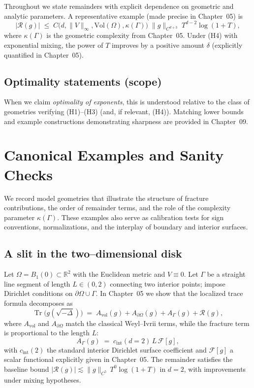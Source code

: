 Throughout we state remainders with explicit dependence on geometric and
analytic parameters. A representative example (made precise in
Chapter~05) is
\[
  |\mathcal{R}(g)| \;\le\;
  C\big(d,\|V\|_\infty,\mathrm{Vol}(\Omega),\kappa(\Gamma)\big)\;
  \|g\|_{C^{d+3}}\; T^{d-2}\log(1+T),
\]
where $\kappa(\Gamma)$ is the geometric complexity from
Chapter~05. Under (H4) with exponential mixing, the power of $T$ improves by
a positive amount $\delta$ (explicitly quantified in Chapter~05).

\subsection{Optimality statements (scope)}
\label{sub:intro-optimality-scope}

When we claim \emph{optimality of exponents}, this is understood relative
to the class of geometries verifying (H1)–(H3) (and, if relevant, (H4)).
Matching lower bounds and example constructions demonstrating sharpness are
provided in Chapter~09.


\section{Canonical Examples and Sanity Checks}
\label{sec:intro-examples}

We record model geometries that illustrate the structure of fracture
contributions, the order of remainder terms, and the role of the complexity
parameter $\kappa(\Gamma)$. These examples also serve as calibration tests
for sign conventions, normalizations, and the interplay of boundary and
interior surfaces.

\subsection{A slit in the two–dimensional disk}
\label{sub:intro-ex-disk-slit}

Let $\Omega=B_1(0)\subset\mathbb{R}^2$ with the Euclidean metric and
$V\equiv 0$. Let $\Gamma$ be a straight line segment of length $L\in(0,2)$
connecting two interior points; impose Dirichlet conditions on
$\partial\Omega\cup\Gamma$. In Chapter~05 we show that the localized trace
formula decomposes as
\[
  \operatorname{Tr}\big(g(\sqrt{-\Delta})\big)
  \;=\; A_{\mathrm{vol}}(g) + A_{\partial\Omega}(g)
        + A_\Gamma(g) + \mathcal{R}(g),
\]
where $A_{\mathrm{vol}}$ and $A_{\partial\Omega}$ match the classical
Weyl–Ivrii terms, while the fracture term is proportional to the length $L$:
\[
  A_\Gamma(g) \;=\; c_{\mathrm{int}}(d=2)\,L\,\mathcal{F}[g],
\]
with $c_{\mathrm{int}}(2)$ the standard interior Dirichlet surface
coefficient and $\mathcal{F}[g]$ a scalar functional explicitly given in
Chapter~05. The remainder satisfies the baseline bound
$|\mathcal{R}(g)|\lesssim \|g\|_{C^5}\,T^0\log(1+T)$ in $d=2$,
with improvements under mixing hypotheses.

